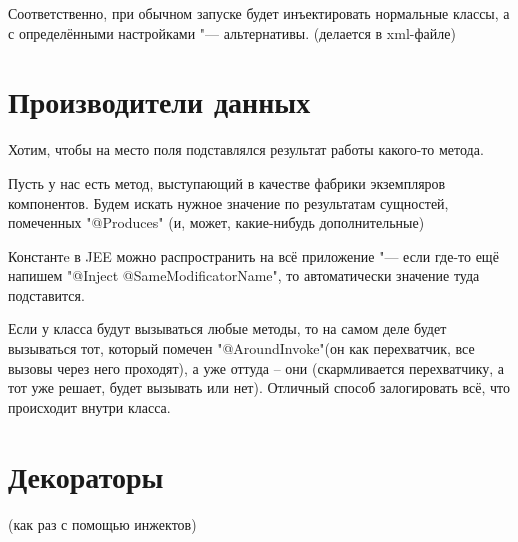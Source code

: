 Соответственно, при обычном запуске будет инъектировать нормальные классы, 
а с определёнными настройками "--- альтернативы. (делается в xml-файле)

\section{Производители данных}
Хотим, чтобы на место поля подставлялся результат работы какого-то метода.

Пусть у нас есть метод, выступающий в качестве фабрики экземпляров компонентов.
Будем искать нужное значение по результатам сущностей, помеченных \java"@Produces"
(и, может, какие-нибудь дополнительные)

Константe в JEE можно распространить на всё приложение "--- если где-то ещё напишем \java"@Inject @SameModificatorName", 
то автоматически значение туда подставится.

Если у класса будут вызываться любые методы, то на самом деле будет вызываться
тот, который помечен \java"@AroundInvoke"(он как перехватчик, все вызовы через него проходят),
а уже оттуда -- они (скармливается перехватчику, а тот уже решает, будет вызывать или нет).
Отличный способ залогировать всё, что происходит внутри класса.

\section{Декораторы}
(как раз с помощью инжектов)

